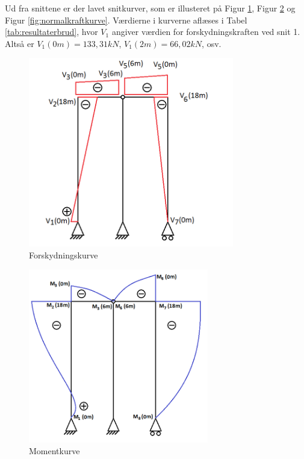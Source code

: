 Ud fra snittene er der lavet snitkurver, som er illusteret på Figur \ref{fig:forskydningskurve}, Figur \ref{fig:momentkurve} og Figur \ref{fig:normalkraftkurve}. Værdierne i kurverne aflæses i Tabel \ref{tab:resultaterbrud}, hvor $V_1$ angiver værdien for forskydningskraften ved snit 1. Altså er $V_1(0m) = 133,31 kN$, $V_1(2m) = 66,02 kN$, osv.

\begin{figure}[H]
	\centering
	\includegraphics[width=0.8\textwidth]{billeder/sk.png}
	\caption{Forskydningskurve}
	\label{fig:forskydningskurve}
\end{figure}

\begin{figure}[H]
	\centering
	\includegraphics[width=0.7\textwidth]{billeder/skkm.png}
	\caption{Momentkurve}
	\label{fig:momentkurve}
\end{figure}

